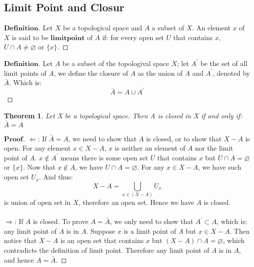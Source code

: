 \documentclass[a4paper, 11pt]{article}
\newtheorem{theorem}{Theorem}
\theoremstyle{remark}
\newenvironment{myprf}
{\renewcommand\qedsymbol{$ $}\begin{proof}[$\mathbf{Proof}$]}
  {\end{proof}}
\newenvironment{mydef}
{\renewcommand\qedsymbol{$ $}\begin{proof}[$\mathbf{Definition}$]}
  {\end{proof}}
\theoremstyle{definition}
\begin{document}
\subsection{Limit Point and Closur}
\begin{mydef}
    Let $X$ be a topological space and $A$ a subset of $X$. An element $x$ of $X$
    is said to be $\bm{limit point}$ of $A$ if: for every open set $U$ that 
    contains $x$, $U\cap A\neq \varnothing$ or $\{x\}$.
\end{mydef}
\begin{mydef}
        Let $A$ be a subset of the topologival space $X$; let $A^{'}$ be the set
        of all limit points of $A$, we define the closure of $A$ as the union
        of $A$ and $A^{'}$, denoted by $\bar{A}$. Which is:
        $$
        \bar{A}=A\cup A^{'}
        $$
\end{mydef}
\begin{theorem}
    Let X be a topological space. Then A is closed in  X if and only if:$\bar{A}=A$
\end{theorem}
\begin{myprf}
        $\Leftarrow$: If $\bar{A}=A$, we need to show that $A$ is closed, or to
        show that
        $X-A$ is open. For any element $x\in X-A$, $x$ is neither an element of
        $A$ nor the limit point of $A$. $x\notin A^{'}$ means there is some 
        open set $U$ that contains $x$ but $U\cap A=\varnothing$ or
        $\{x\}$. Now that $x\notin A$, we have $U\cap A=\varnothing$. For any
        $x\in X-A$, we have such open set $U_x$. And thus:
        $$
        X-A=\bigcup_{x\in (X-A)} U_x
        $$ is union of open set in $X$, therefore an open set. Hence we have $A$
        is closed.\\
        \\
        $\Rightarrow$: If $A$ is closed. To prove $A=\bar{A}$, we only need to 
        show that $A^{'}\subset A$, which is: any limit point of $A$ is in $A$.
        Suppose $x$ is a limit point of $A$ but $x\in X-A$. Then notice that $X-A$ is
        an open set that contains $x$ but $(X-A)\cap A=\varnothing$, which 
        contradicts the definition of limit point. Therefore any limit point of 
        $A$ is in $A$, and hence $A=\bar{A}$.
\end{myprf}
\end{document}
